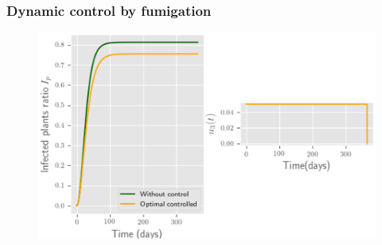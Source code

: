 	\begin{frame}[plain]
	\frametitle{Dynamic control by fumigation}
	\begin{figure}
		\centering	
		\includegraphics[scale=0.5]{Feathergraphics/one_control_simulation_1.eps}
	\end{figure}	
\end{frame}


